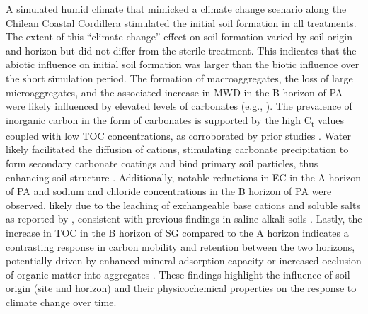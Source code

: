 A simulated humid climate that mimicked a climate change scenario along the Chilean Coastal Cordillera stimulated the initial soil formation in all treatments. The extent of this ``climate change'' effect on soil formation varied by soil origin and horizon but did not differ from the sterile treatment. This indicates that the abiotic influence on initial soil formation was larger than the biotic influence over the short simulation period. The formation of macroaggregates, the loss of large microaggregates, and the associated increase in MWD in the B horizon of PA were likely influenced by elevated levels of carbonates (e.g., ). The prevalence of inorganic carbon in the form of carbonates is supported by the high C\textsubscript{t} values coupled with low TOC concentrations, as corroborated by prior studies \citep{SchulzeMakuch2018, RiverasMunoz2022}. Water likely facilitated the diffusion of cations, stimulating carbonate precipitation to form secondary carbonate coatings and bind primary soil particles, thus enhancing soil structure \citep{Bronick2005}. Additionally, notable reductions in EC in the A horizon of PA and sodium and chloride concentrations in the B horizon of PA were observed, likely due to the leaching of exchangeable base cations and soluble salts as reported by \citet{Bernhard2018}, consistent with previous findings in saline-alkali soils \citep{Wang2017}. Lastly, the increase in TOC in the B horizon of SG compared to the A horizon indicates a contrasting response in carbon mobility and retention between the two horizons, potentially driven by enhanced mineral adsorption capacity or increased occlusion of organic matter into aggregates \citep{Kramer2018}. These findings highlight the influence of soil origin (site and horizon) and their physicochemical properties on the response to climate change over time.

